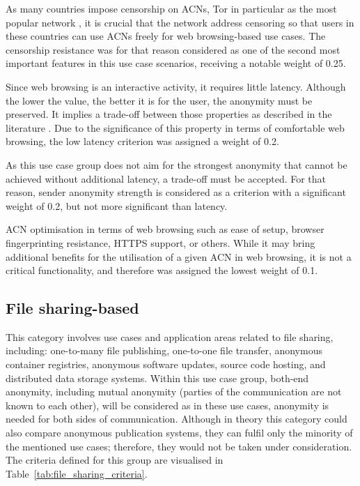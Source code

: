 As many countries impose censorship on ACNs, Tor in particular as the most popular network \cite{gfw-china, africa}, it is crucial that the network address censoring so that users in these countries can use ACNs freely for web browsing-based use cases. The censorship resistance was for that reason considered as one of the second most important features in this use case scenarios, receiving a notable weight of 0.25.
    
Since web browsing is an interactive activity, it requires little latency. Although the lower the value, the better it is for the user, the anonymity must be preserved. It implies a trade-off between those properties as described in the literature \cite{tor-design}. Due to the significance of this property in terms of comfortable web browsing, the low latency criterion was assigned a weight of 0.2.
    
As this use case group does not aim for the strongest anonymity that cannot be achieved without additional latency, a trade-off must be accepted. For that reason, sender anonymity strength is considered as a criterion with a significant weight of 0.2, but not more significant than latency.
    
ACN optimisation in terms of web browsing such as ease of setup, browser fingerprinting resistance, HTTPS support, or others. While it may bring additional benefits for the utilisation of a given ACN in web browsing, it is not a critical functionality, and therefore was assigned the lowest weight of 0.1.


\subsection{File sharing-based}
This category involves use cases and application areas related to file sharing, including: one-to-many file publishing, one-to-one file transfer, anonymous container registries, anonymous software updates, source code hosting, and distributed data storage systems.
Within this use case group, both-end anonymity, including mutual anonymity (parties of the communication are not known to each other), will be considered as in these use cases, anonymity is needed for both sides of communication.
Although in theory this category could also compare anonymous publication systems, they can fulfil only the minority of the mentioned use cases; therefore, they would not be taken under consideration.
The criteria defined for this group are visualised in Table~\ref{tab:file_sharing_criteria}.


